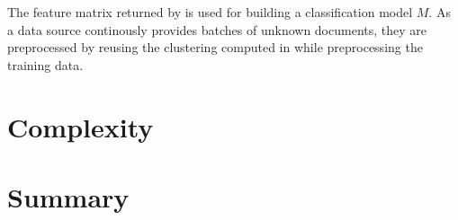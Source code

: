 The feature matrix returned by  is used for
building a classification model $M$. As a data source continously provides
batches of unknown documents, they are preprocessed by reusing the clustering
computed in while preprocessing the training data.

\section{Complexity}

\section{Summary}